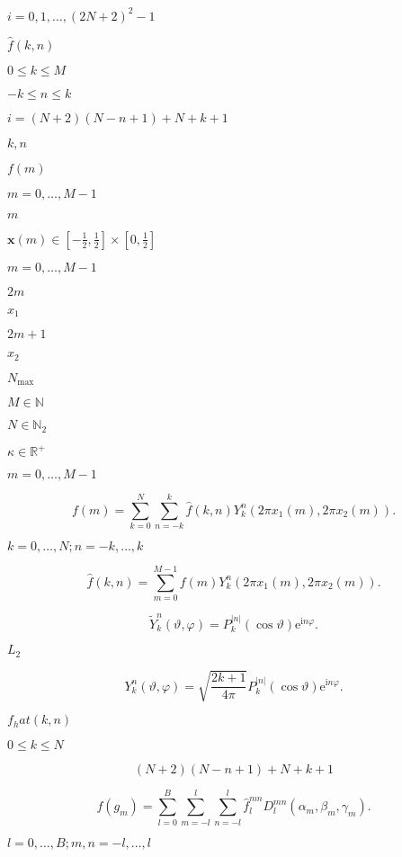 \documentclass{article}
\begin{document}
$i=0,1,\ldots,(2N+2)^2-1$
\pagebreak

$\hat{f}(k,n)$
\pagebreak

$0 \le k \le M$
\pagebreak

$-k \le n \le k$
\pagebreak

$i = (N+2)(N-n+1)+N+k+1$
\pagebreak

$k,n$
\pagebreak

$f(m)$
\pagebreak

$m=0,\ldots,M-1$
\pagebreak

$m$
\pagebreak

$\mathbf{x}(m) \in [-\frac{1}{2},\frac{1}{2}] \times [0,\frac{1}{2}]$
\pagebreak

$m = 0, \ldots,M-1$
\pagebreak

$2m$
\pagebreak

$x_1$
\pagebreak

$2m+1$
\pagebreak

$x_2$
\pagebreak

$N_{\text{max}}$
\pagebreak

$M \in \mathbb{N}$
\pagebreak

$N \in \mathbb{N}_2$
\pagebreak

$\kappa \in \mathbb{R}^{+}$
\pagebreak

$m = 0,\ldots,M-1$
\pagebreak

\[ f(m) = \sum_{k=0}^N \sum_{n=-k}^k \hat{f}(k,n) Y_k^n\left(2\pi x_1(m), 2\pi x_2(m)\right). \]
\pagebreak

$k=0,\ldots,N; n=-k,\ldots,k$
\pagebreak

\[ \hat{f}(k,n) = \sum_{m = 0}^{M-1} f(m) Y_k^n\left(2\pi x_1(m), 2\pi x_2(m)\right). \]
\pagebreak

\[ \tilde{Y}_k^n(\vartheta,\varphi) = P_k^{|n|}(\cos\vartheta) \mathrm{e}^{\mathrm{i} n \varphi}. \]
\pagebreak

$L_2$
\pagebreak

\[ Y_k^n(\vartheta,\varphi) = \sqrt{\frac{2k+1}{4\pi}} P_k^{|n|}(\cos\vartheta) \mathrm{e}^{\mathrm{i} n \varphi}. \]
\pagebreak

$f_hat(k,n)$
\pagebreak

$0 \le k \le N$
\pagebreak

\[ (N+2)(N-n+1)+N+k+1 \]
\pagebreak

\[ f(g_m) = \sum_{l=0}^B \sum_{m=-l}^l \sum_{n=-l}^l \hat{f}^{mn}_l D_l^{mn}\left( \alpha_m,\beta_m,\gamma_m\right). \]
\pagebreak

$l=0,\ldots,B; m,n=-l,\ldots,l$
\pagebreak
\end{document}
